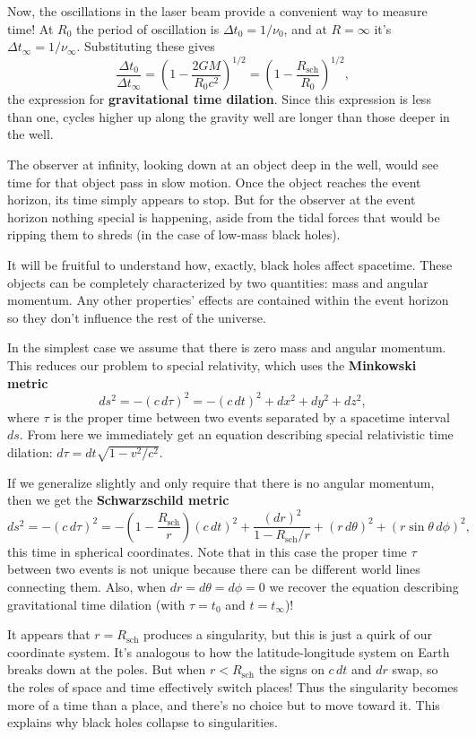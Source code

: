 \documentclass[../a062main.tex]{subfiles}
\begin{document}
Now, the oscillations in the laser beam provide a convenient way to measure time!
At $R_0$ the period of oscillation is $\Delta t_0 = 1 / \nu_0$, and at $R = \infty$ it's $\Delta t_\infty = 1 / \nu_\infty$.
Substituting these gives
\[ \boxed{\frac{\Delta t_0}{\Delta t_\infty} = \left( 1 - \frac{2GM}{R_0c^2} \right)^{1 / 2} = \left( 1 - \frac{R_\textrm{sch}}{R_0} \right)^{1 / 2}}, \]
the expression for \textbf{gravitational time dilation}.
Since this expression is less than one, cycles higher up along the gravity well are longer than those deeper in the well.

The observer at infinity, looking down at an object deep in the well, would see time for that object pass in slow motion.
Once the object reaches the event horizon, its time simply appears to stop.
But for the observer at the event horizon nothing special is happening, aside from the tidal forces that would be ripping them to shreds (in the case of low-mass black holes).

It will be fruitful to understand how, exactly, black holes affect spacetime.
These objects can be completely characterized by two quantities: mass and angular momentum.
Any other properties' effects are contained within the event horizon so they don't influence the rest of the universe.

In the simplest case we assume that there is zero mass and angular momentum.
This reduces our problem to special relativity, which uses the \textbf{Minkowski metric}
\[ ds^2 = -(c\,d\tau)^2 = -(c\,dt)^2 + dx^2 + dy^2 + dz^2, \]
where $\tau$ is the proper time between two events separated by a spacetime interval $ds$.
From here we immediately get an equation describing special relativistic time dilation: $d\tau = dt \sqrt{1 - v^2 / c^2}$.

If we generalize slightly and only require that there is no angular momentum, then we get the \textbf{Schwarzschild metric}
\[ ds^2 = -(c\,d\tau)^2 = -\left( 1 - \frac{R_\textrm{sch}}{r} \right)(c\,dt)^2 + \frac{(dr)^2}{1 - R_\textrm{sch} / r} + (r\,d\theta)^2 + (r\sin\theta\,d\phi)^2, \]
this time in spherical coordinates.
Note that in this case the proper time $\tau$ between two events is not unique because there can be different world lines connecting them.
Also, when $dr = d\theta = d\phi = 0$ we recover the equation describing gravitational time dilation (with $\tau = t_0$ and $t = t_\infty$)!

It appears that $r = R_\textrm{sch}$ produces a singularity, but this is just a quirk of our coordinate system.
It's analogous to how the latitude-longitude system on Earth breaks down at the poles.
But when $r < R_\textrm{sch}$ the signs on $c\,dt$ and $dr$ swap, so the roles of space and time effectively switch places!
Thus the singularity becomes more of a time than a place, and there's no choice but to move toward it.
This explains why black holes collapse to singularities.
\end{document}
